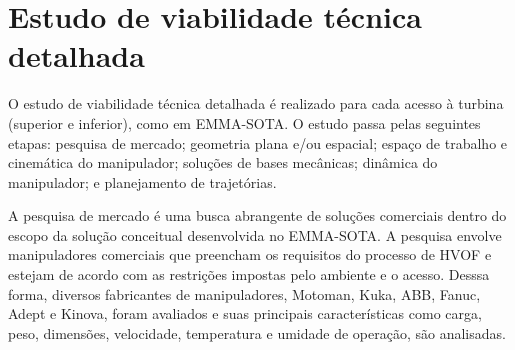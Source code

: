 \section{Estudo de viabilidade técnica detalhada}\label{sec::viatec}
O estudo de viabilidade técnica detalhada é realizado para cada acesso à turbina
(superior e inferior), como em EMMA-SOTA. O estudo passa pelas
seguintes etapas: pesquisa de mercado; geometria plana e/ou espacial; espaço de
trabalho e cinemática do manipulador; soluções de bases mecânicas; dinâmica do manipulador; e planejamento de trajetórias.

A pesquisa de mercado é uma busca abrangente de soluções comerciais dentro do
escopo da solução conceitual desenvolvida no EMMA-SOTA. A pesquisa envolve
manipuladores comerciais que preencham os requisitos do processo de HVOF e
estejam de acordo com as restrições impostas pelo ambiente e o acesso. Desssa
forma, diversos fabricantes de manipuladores, Motoman, Kuka, ABB, Fanuc,
Adept e Kinova, foram avaliados e suas principais características como carga,
peso, dimensões, velocidade, temperatura e umidade de operação, são analisadas.


